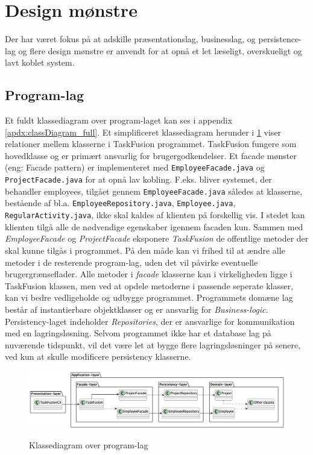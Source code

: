 \section{Design mønstre} \label{chap:design}
Der har været fokus på at adskille præsentationslag, businesslag, og persistence-lag og flere design mønstre er anvendt for at opnå et let læseligt, overskueligt og lavt koblet system. 

\subsection{Program-lag}
Et fuldt klassediagram over program-laget kan ses i appendix \ref{apdx:classDiagram_full}. Et simplificeret klassediagram herunder i \ref{fig:class_persistency_layer} viser relationer mellem klasserne i TaskFusion programmet. TaskFusion fungere som hovedklasse og er primært ansvarlig for brugergodkendelser. Et facade mønster (eng: Facade pattern) er implementeret med \texttt{EmployeeFacade.java} og \texttt{ProjectFacade.java} for at opnå lav kobling. F.eks. bliver systemet, der behandler employees, tilgået gennem \texttt{EmployeeFacade.java} således at klasserne, bestående af bl.a. \texttt{EmployeeRepository.java}, \texttt{Employee.java}, \texttt{RegularActivity.java}, ikke skal kaldes af klienten på forskellig vis. I stedet kan klienten tilgå alle de nødvendige egenskaber igennem facaden kun. Sammen med \textit{EmployeeFacade} og \textit{ProjectFacade} eksponere \textit{TaskFusion} de offentlige metoder der skal kunne tilgås i programmet. På den måde kan vi frihed til at ændre alle metoder i de resterende program-lag, uden det vil påvirke eventuelle brugergrænseflader. Alle metoder i \textit{facade} klasserne kan i virkeligheden ligge i TaskFusion klassen, men ved at opdele metoderne i passende seperate klasser, kan vi bedre vedligeholde og udbygge programmet. 
Programmets domæne lag består af instantierbare objektklasser og er ansvarlig for \textit{Business-logic}. Persistency-laget indeholder \textit{Repositories}, der er ansvarlige for kommunikation med en lagringsløsning. Selvom programmet ikke har et database lag på nuværende tidspunkt, vil det være let at bygge flere lagringsløsninger på senere, ved kun at skulle modificere persistency klasserne. 

\begin{figure}[H]
    \centering
    \caption{Klassediagram over program-lag}
    \includegraphics[width = \textwidth, keepaspectratio]{TaskFusion/out/assets/diagrams/class_persistency_layer/ClassDiagram_layer.png}
    \label{fig:class_persistency_layer}
\end{figure}

